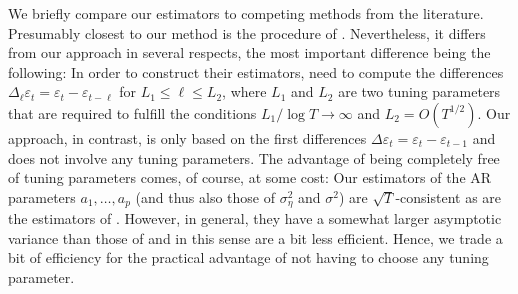 We briefly compare our estimators to competing methods from the literature. Presumably closest to our method is the procedure of \cite{Hall2003}. Nevertheless, it differs from our approach in several respects, the most important difference being the following: In order to construct their estimators, \cite{Hall2003} need to compute the differences $\Delta_\ell \varepsilon_t = \varepsilon_t - \varepsilon_{t-\ell}$ for $L_1 \le \ell \le L_2$, where $L_1$ and $L_2$ are two tuning parameters that are required to fulfill the conditions $L_1 / \log T \rightarrow \infty$ and $L_2 = O(T^{1/2})$. Our approach, in contrast, is only based on the first differences $\Delta \varepsilon_t = \varepsilon_t - \varepsilon_{t-1}$ and does not involve any tuning parameters. The advantage of being completely free of tuning parameters comes, of course, at some cost: Our estimators of the AR parameters $a_1,\ldots,a_p$ (and thus also those of $\sigma_\eta^2$ and $\sigma^2$) are $\sqrt{T}$-consistent as are the estimators of \cite{Hall2003}. However, in general, they have a somewhat larger asymptotic variance than those of \cite{Hall2003} and in this sense are a bit less efficient. Hence, we trade a bit of efficiency for the practical advantage of not having to choose any tuning parameter. 



